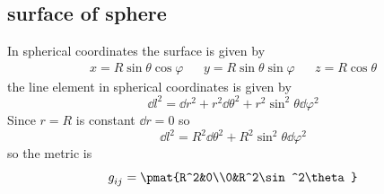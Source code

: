 \subsection{surface of sphere}
In spherical coordinates the surface is given by
\begin{align}
	x=R\sin\theta\cos\varphi && y=R\sin\theta\sin\varphi && z=R\cos\theta
\end{align}
the line element in spherical coordinates is given by
\begin{equation}
	\dd l^2 = \dd r^2 + r^2\dd\theta^2 + r^2\sin^2\theta\dd\varphi^2
\end{equation}
Since \(r=R\) is constant \(\dd r=0\) so
\begin{equation}
	\dd l^2 = R^2\dd\theta^2 + R^2\sin^2\theta\dd\varphi^2
\end{equation}
so the metric is
\begin{equation}
	g\indices{_{ij}} = \pmat{R^2&0\\0&R^2\sin^2\theta}
\end{equation}